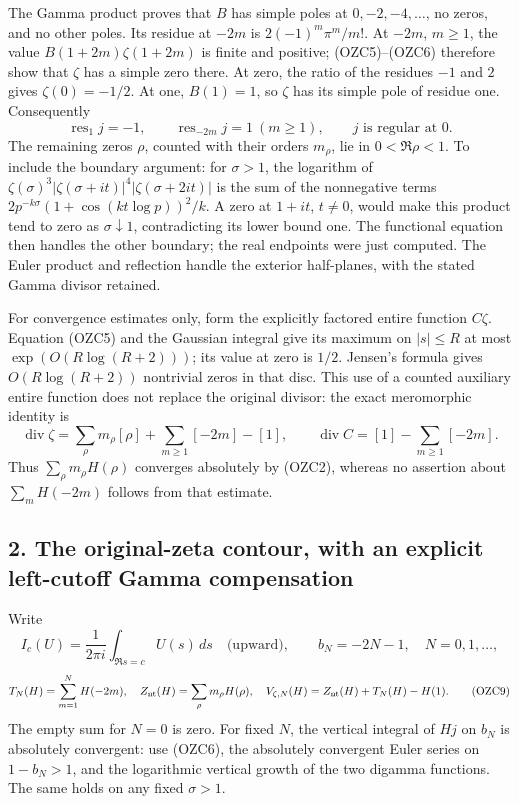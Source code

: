 \documentclass[
  10pt,
  a4paper,
]{article}
\begin{document}
The Gamma product proves that \(B\) has simple poles at
\(0,-2,-4,\ldots\), no zeros, and no other poles. Its residue at \(-2m\)
is \(2(-1)^m\pi^m/m!\). At \(-2m\), \(m\ge1\), the value
\(B(1+2m)\zeta(1+2m)\) is finite and positive; (OZC5)--(OZC6) therefore
show that \(\zeta\) has a simple zero there. At zero, the ratio of the
residues \(-1\) and \(2\) gives \(\zeta(0)=-1/2\). At one, \(B(1)=1\),
so \(\zeta\) has its simple pole of residue one. Consequently \[
\operatorname{res}_{1}j=-1,\qquad
\operatorname{res}_{-2m}j=1\ (m\ge1),\qquad j\text{ is regular at }0.
\tag{OZC7}
\] The remaining zeros \(\rho\), counted with their orders \(m_\rho\),
lie in \(0<\Re\rho<1\). To include the boundary argument: for
\(\sigma>1\), the logarithm of
\(\zeta(\sigma)^3|\zeta(\sigma+it)|^4|\zeta(\sigma+2it)|\) is the sum of
the nonnegative terms \(2p^{-k\sigma}(1+\cos(kt\log p))^2/k\). A zero at
\(1+it\), \(t\ne0\), would make this product tend to zero as
\(\sigma\downarrow1\), contradicting its lower bound one. The functional
equation then handles the other boundary; the real endpoints were just
computed. The Euler product and reflection handle the exterior
half-planes, with the stated Gamma divisor retained.

For convergence estimates only, form the explicitly factored entire
function \(C\zeta\). Equation (OZC5) and the Gaussian integral give its
maximum on \(|s|\le R\) at most \(\exp(O(R\log(R+2)))\); its value at
zero is \(1/2\). Jensen's formula gives \(O(R\log(R+2))\) nontrivial
zeros in that disc. This use of a counted auxiliary entire function does
not replace the original divisor: the exact meromorphic identity is \[
\operatorname{div}\zeta
=\sum_\rho m_\rho[\rho]+\sum_{m\ge1}[-2m]-[1],
\qquad
\operatorname{div}C=[1]-\sum_{m\ge1}[-2m].
\tag{OZC8}
\] Thus \(\sum_\rho m_\rho H(\rho)\) converges absolutely by (OZC2),
whereas no assertion about \(\sum_m H(-2m)\) follows from that estimate.

\subsection{2. The original-zeta contour, with an explicit left-cutoff
Gamma
compensation}\label{the-original-zeta-contour-with-an-explicit-left-cutoff-gamma-compensation}

Write \[
I_c(U)=\frac1{2\pi i}\int_{\Re s=c}U(s)\,ds
\quad\text{(upward)},\qquad b_N=-2N-1,\quad N=0,1,\ldots,
\] \[
T_N(H)=\sum_{m=1}^N H(-2m),\quad
Z_{\rm nt}(H)=\sum_\rho m_\rho H(\rho),\quad
V_{\zeta,N}(H)=Z_{\rm nt}(H)+T_N(H)-H(1).
\tag{OZC9}
\] The empty sum for \(N=0\) is zero. For fixed \(N\), the vertical
integral of \(Hj\) on \(b_N\) is absolutely convergent: use (OZC6), the
absolutely convergent Euler series on \(1-b_N>1\), and the logarithmic
vertical growth of the two digamma functions. The same holds on any
fixed \(\sigma>1\).
\end{document}
